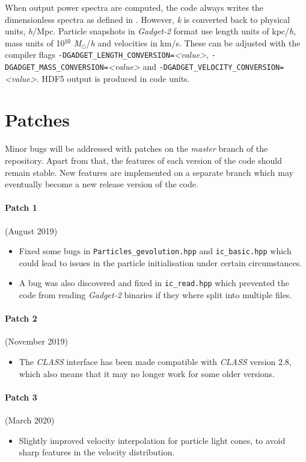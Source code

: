 \documentclass[a4paper,10pt]{article}
\begin{document}
When output power spectra are computed, the code always writes the dimensionless spectra as defined in \cite{Adamek:2015eda}. However,
\textit{k} is converted back to physical units, \textit{h}/Mpc. Particle snapshots in \textit{Gadget-2} format use length units of
kpc/\textit{h}, mass units of 10$^\mathsf{10}$ \textit{M}$_\odot$/\textit{h} and velocities in km/s. These can be adjusted with the compiler
flags \texttt{-DGADGET\_LENGTH\_CONVERSION=}\textit{<value>}, \texttt{-DGADGET\_MASS\_CONVERSION=}\textit{<value>} and
\texttt{-DGADGET\_VELOCITY\_CONVERSION=}\textit{<value>}. HDF5 output is produced in code units.

\section{Patches}

Minor bugs will be addressed with patches on the \textit{master} branch of the repository. Apart from that, the features of each version of
the code should remain stable. New features are implemented on a separate branch which may eventually become a new release version of the
code.

\paragraph{Patch 1} (August 2019)
\begin{itemize}
\item Fixed some bugs in \texttt{Particles\_gevolution.hpp} and \texttt{ic\_basic.hpp} which could lead to issues in the particle initialisation under certain circumstances.
\item A bug was also discovered and fixed in \texttt{ic\_read.hpp} which prevented the code from reading \textit{Gadget-2} binaries if they where split into multiple files.
\end{itemize}

\paragraph{Patch 2} (November 2019)
\begin{itemize}
\item The \textit{CLASS} interface has been made compatible with \textit{CLASS} version 2.8, which also means that it may no longer work for some older versions.
\end{itemize}

\paragraph{Patch 3} (March 2020)
\begin{itemize}
\item Slightly improved velocity interpolation for particle light cones, to avoid sharp features in the velocity distribution.
\end{itemize}




\end{document}
